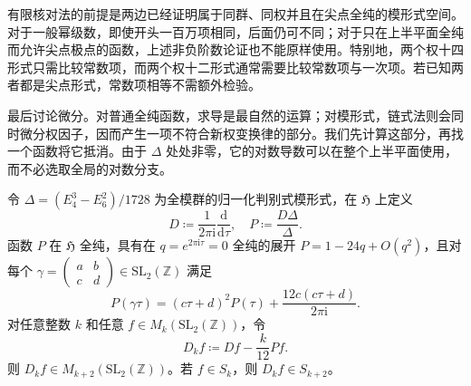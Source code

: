 有限核对法的前提是两边已经证明属于同群、同权并且在尖点全纯的模形式空间。对于一般幂级数，即使开头一百万项相同，后面仍可不同；对于只在上半平面全纯而允许尖点极点的函数，上述非负阶数论证也不能原样使用。特别地，两个权十四形式只需比较常数项，而两个权十二形式通常需要比较常数项与一次项。若已知两者都是尖点形式，常数项相等不需额外检验。


\ProseParagraphBreak

最后讨论微分。对普通全纯函数，求导是最自然的运算；对模形式，链式法则会同时微分权因子，因而产生一项不符合新权变换律的部分。我们先计算这部分，再找一个函数将它抵消。由于 \(\Delta\) 处处非零，它的对数导数可以在整个上半平面使用，而不必选取全局的对数分支。

\begin{proposition}[保持模性的修正导数]\label{b3:prop:23-modular-derivative}
令 \(\Delta=(E_4^3-E_6^2)/1728\) 为全模群的归一化判别式模形式，在 \(\mathfrak H\) 上定义
\[
 D\coloneqq\frac{1}{2\pi\mathrm{i}}\frac{\mathrm{d}}{\mathrm{d}\tau},
 \quad P\coloneqq\frac{D\Delta}{\Delta}.
\]
函数 \(P\) 在 \(\mathfrak H\) 全纯，具有在 \(q=e^{2\pi\mathrm{i}\tau}=0\) 全纯的展开 \(P=1-24q+O(q^2)\)，且对每个 \(\gamma=\left(\begin{smallmatrix}a&b\\c&d\end{smallmatrix}\right)\in\mathrm{SL}_2(\mathbb Z)\) 满足
\begin{equation}\label{b3:eq:23-P-transformation}
 P(\gamma\tau)=(c\tau+d)^2P(\tau)
       +\frac{12c(c\tau+d)}{2\pi\mathrm{i}}.
\end{equation}
对任意整数 \(k\) 和任意 \(f\in M_k(\mathrm{SL}_2(\mathbb Z))\)，令
\[
 D_kf\coloneqq Df-\frac{k}{12}Pf.
\]
则 \(D_kf\in M_{k+2}(\mathrm{SL}_2(\mathbb Z))\)。若 \(f\in S_k\)，则 \(D_kf\in S_{k+2}\)。
\end{proposition}

